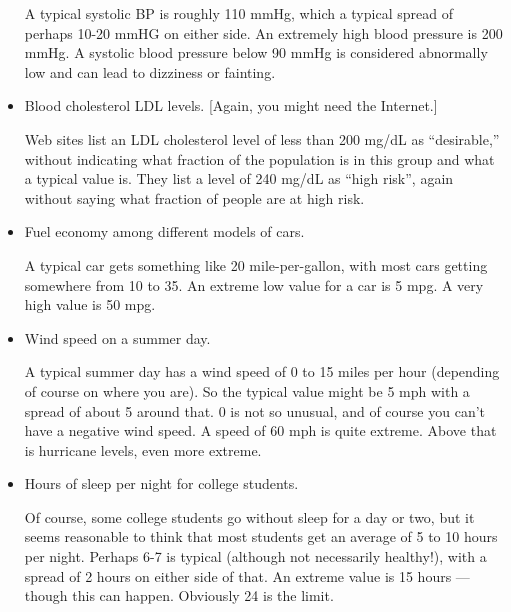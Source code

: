 \begin{itemize}
\begin{AnswerText}
A typical systolic BP is roughly 110 mmHg, which a typical spread of
perhaps 10-20 mmHG on either side.  An extremely high blood pressure
is 200 mmHg.  A systolic blood pressure below 90 mmHg is considered
abnormally low and can lead to dizziness or fainting.
\end{AnswerText}

\item Blood cholesterol LDL levels. [Again, you might need the
  Internet.]\TextEntry[itemname=cholesterol]

\begin{AnswerText}
Web sites list an LDL cholesterol level of less than 200 mg/dL as
``desirable,'' without indicating what fraction of the population is
in this group and what a typical value is.  They list a level of 240
mg/dL as ``high risk'', again without saying what fraction of people
are at high risk.  
\end{AnswerText}

\item Fuel economy among different models of
  cars.\TextEntry[itemname=car]

\begin{AnswerText}
A typical car gets something like 20 mile-per-gallon, with most cars
getting somewhere from 10 to 35.  An extreme low value for a car is 5
mpg.  A very high value is 50 mpg.
\end{AnswerText}

\item Wind speed on a summer day.\TextEntry[itemname=wind]

\begin{AnswerText}
A typical summer day has a wind speed of 0 to 15 miles per hour
(depending of course on where you are).  So the typical value might be
5 mph with a spread of about 5 around that.  0 is not so unusual, and
of course you can't have a negative wind speed.  A speed of 60 mph is
quite extreme.  Above that is hurricane levels, even more extreme.  
\end{AnswerText}

\item Hours of sleep per night for college students.\TextEntry[itemname=sleep]

\begin{AnswerText}
Of course, some college students go without sleep for a day or two,
but it seems reasonable to think that most students get an average of
5 to 10 hours per night.  Perhaps 6-7 is typical (although not
necessarily healthy!), with a spread of 2 hours on either side of
that.  An extreme value is 15 hours --- though this can happen.
Obviously 24 is the limit.
\end{AnswerText}

\end{itemize}

